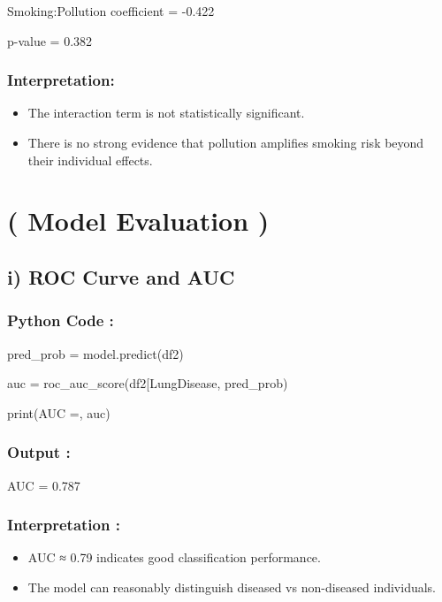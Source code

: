 \documentclass[
]{article}
\begin{document}
Smoking:Pollution coefficient = -0.422

p-value = 0.382

\subsubsection{Interpretation:}\label{interpretation-5}

\begin{itemize}
\item
  The interaction term is not statistically significant.
\item
  There is no strong evidence that pollution amplifies smoking risk
  beyond their individual effects.
\end{itemize}

\section{\texorpdfstring{( \textbf{Model Evaluation
)}}{( Model Evaluation )}}\label{model-evaluation}

\subsection{i) ROC Curve and AUC}\label{i-roc-curve-and-auc}

\subsubsection{Python Code :}\label{python-code-4}

pred\_prob = model.predict(df2)

auc =
roc\_auc\_score(df2{[}\textquotesingle LungDisease\textquotesingle{]},
pred\_prob)

print(\textquotesingle AUC =\textquotesingle, auc)

\subsubsection{Output :}\label{output-1}

AUC = 0.787

\subsubsection{Interpretation :}\label{interpretation-6}

\begin{itemize}
\item
  AUC ≈ 0.79 indicates good classification performance.
\item
  The model can reasonably distinguish diseased vs non-diseased
  individuals.
\end{itemize}
\end{document}
